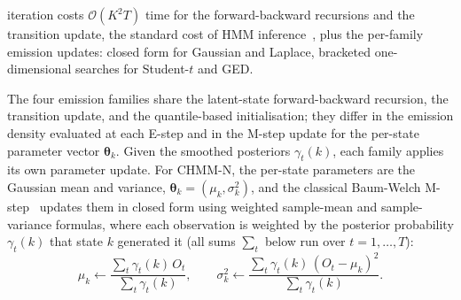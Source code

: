 iteration costs $\mathcal{O}(K^2 T)$ time for the forward-backward recursions and the transition update, the standard cost of HMM inference~\cite{rabiner1986introduction}, plus the per-family emission updates: closed form for Gaussian and Laplace, bracketed one-dimensional searches for Student-$t$ and GED.

The four emission families share the latent-state forward-backward recursion, the transition update, and the quantile-based initialisation; they differ in the emission density evaluated at each E-step and in the M-step update for the per-state parameter vector $\boldsymbol\theta_k$. Given the smoothed posteriors $\gamma_t(k)$, each family applies its own parameter update. For CHMM-N, the per-state parameters are the Gaussian mean and variance, $\boldsymbol\theta_k = (\mu_k, \sigma_k^2)$, and the classical Baum-Welch M-step~\cite{baum1970maximization} updates them in closed form using weighted sample-mean and sample-variance formulas, where each observation is weighted by the posterior probability $\gamma_t(k)$ that state $k$ generated it (all sums $\sum_t$ below run over $t = 1, \ldots, T$):
\[
\mu_k \leftarrow \frac{\sum_t \gamma_t(k)\, O_t}{\sum_t \gamma_t(k)},
\qquad
\sigma_k^2 \leftarrow \frac{\sum_t \gamma_t(k)\, (O_t - \mu_k)^2}{\sum_t \gamma_t(k)}.
\]

